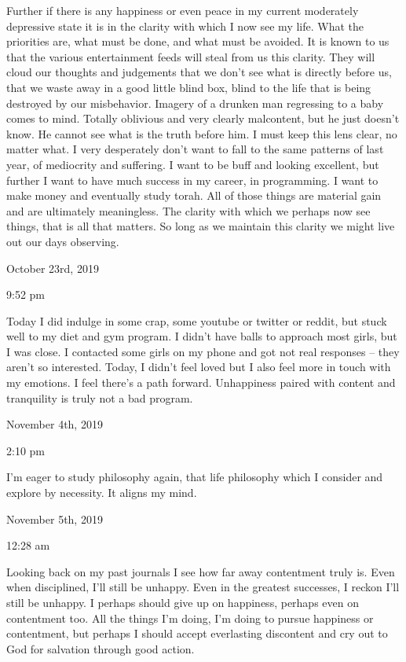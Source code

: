 \qquad Further if there is any happiness or even peace in my current
moderately depressive state it is in the clarity with which I now see my
life. What the priorities are, what must be done, and what must be
avoided. It is known to us that the various entertainment feeds will
steal from us this clarity. They will cloud our thoughts and judgements
that we don't see what is directly before us, that we waste away in a
good little blind box, blind to the life that is being destroyed by our
misbehavior. Imagery of a drunken man regressing to a baby comes to
mind. Totally oblivious and very clearly malcontent, but he just doesn't
know. He cannot see what is the truth before him. I must keep this lens
clear, no matter what. I very desperately don't want to fall to the same
patterns of last year, of mediocrity and suffering. I want to be buff
and looking excellent, but further I want to have much success in my
career, in programming. I want to make money and eventually study torah.
All of those things are material gain and are ultimately meaningless.
The clarity with which we perhaps now see things, that is all that
matters. So long as we maintain this clarity we might live out our days
observing.

\bigskip
\bigskip
October 23rd, 2019

9:52 pm

Today I did indulge in some crap, some youtube or twitter or reddit, but
stuck well to my diet and gym program. I didn't have balls to approach
most girls, but I was close. I contacted some girls on my phone and got
not real responses -- they aren't so interested. Today, I didn't feel
loved but I also feel more in touch with my emotions. I feel there's a
path forward. Unhappiness paired with content and tranquility is truly
not a bad program.

\bigskip
\bigskip
November 4th, 2019

2:10 pm

I'm eager to study philosophy again, that life philosophy which I
consider and explore by necessity. It aligns my mind.

\bigskip
\bigskip
November 5th, 2019

12:28 am

Looking back on my past journals I see how far away contentment truly
is. Even when disciplined, I'll still be unhappy. Even in the greatest
successes, I reckon I'll still be unhappy. I perhaps should give up on
happiness, perhaps even on contentment too. All the things I'm doing,
I'm doing to pursue happiness or contentment, but perhaps I should
accept everlasting discontent and cry out to God for salvation through
good action.

